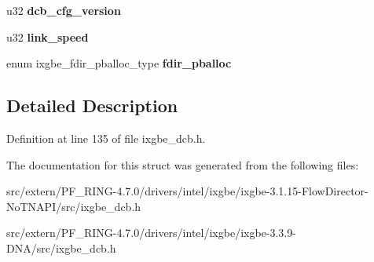 \begin{DoxyCompactItemize}
\item 
\hypertarget{structixgbe__dcb__config_a4ab657a9e224c6f90cc186d38d94ae96}{
u32 {\bfseries dcb\_\-cfg\_\-version}}
\label{structixgbe__dcb__config_a4ab657a9e224c6f90cc186d38d94ae96}

\item 
\hypertarget{structixgbe__dcb__config_afa2ca2c92e53c4eef58059970a40c927}{
u32 {\bfseries link\_\-speed}}
\label{structixgbe__dcb__config_afa2ca2c92e53c4eef58059970a40c927}

\item 
\hypertarget{structixgbe__dcb__config_ad387eca35c5e5f7d0ae86dd4c2e4c7f2}{
enum ixgbe\_\-fdir\_\-pballoc\_\-type {\bfseries fdir\_\-pballoc}}
\label{structixgbe__dcb__config_ad387eca35c5e5f7d0ae86dd4c2e4c7f2}

\end{DoxyCompactItemize}


\subsection{Detailed Description}


Definition at line 135 of file ixgbe\_\-dcb.h.



The documentation for this struct was generated from the following files:\begin{DoxyCompactItemize}
\item 
src/extern/PF\_\-RING-\/4.7.0/drivers/intel/ixgbe/ixgbe-\/3.1.15-\/FlowDirector-\/NoTNAPI/src/ixgbe\_\-dcb.h\item 
src/extern/PF\_\-RING-\/4.7.0/drivers/intel/ixgbe/ixgbe-\/3.3.9-\/DNA/src/ixgbe\_\-dcb.h\end{DoxyCompactItemize}
